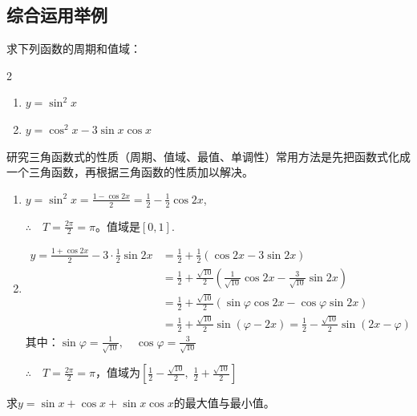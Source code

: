 \subsection*{综合运用举例}

\begin{example}
    求下列函数的周期和值域：
\begin{multicols}{2}
\begin{enumerate}[(1)]
    \item $y=\sin^2x$
    \item $y=\cos^2x-3\sin x\cos x$
\end{enumerate}    
\end{multicols}
\end{example}

\begin{analyze}
    研究三角函数式的性质（周期、值域、最值、单调性）常用方法是先把函数式化成一个三角函数，再根据三角函数的性质加以解决。
\end{analyze}

\begin{solution}
\begin{enumerate}[(1)]
    \item  $y= \sin ^{2}x= \frac {1- \cos 2x}2= \frac 12- \frac 12\cos 2x$,

    $\therefore\quad T= \frac {2\pi }2= \pi$。值域是$[0,1]$.
    
    \item  \[\begin{split}
        y=\frac {1+ \cos 2x}2- 3\cdot \frac 12 \sin 2x &=\frac{1}{2}+\frac{1}{2}\left(\cos2x-3\sin2x\right)\\
    &=\frac{1}{2}+\frac{\sqrt{10}}{2}\left(\frac{1}{\sqrt{10}}\cos 2x-\frac{3}{\sqrt{10}}\sin 2x\right)
    \\
    &=\frac 12+ \frac {\sqrt {10}}2( \sin \varphi \cos 2x- \cos \varphi \sin 2x)\\
    &=\frac{1}{2}+\frac{\sqrt{10}}{2}\sin(\varphi-2x)=\frac{1}{2}-\frac{\sqrt{10}}{2}\sin(2x-\varphi)
    \end{split}\]
其中：$\sin\varphi=\frac{1}{\sqrt{10}},\quad \cos\varphi=\frac{3}{\sqrt{10}}$

$\therefore\quad T=\frac{2\pi}{2}=\pi$，值域为$\left[\frac{1}{2}-\frac{\sqrt{10}}{2},\; \frac{1}{2}+\frac{\sqrt{10}}{2}\right]$
\end{enumerate}
\end{solution}

\begin{example}
    求$y=\sin x+\cos x+\sin x\cos x$的最大值与最小值。
\end{example}

